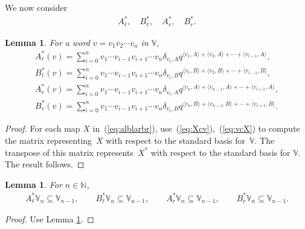 \documentclass[pdftex]{sigma}
\numberwithin{equation}{section}
\newtheorem{Lemma}[Theorem]{Lemma}
\begin{document}
We now consider
\begin{gather}\label{eq:AlBl}
A^*_\ell, \quad B^*_\ell, \quad A^*_r,\quad B^*_r.
\end{gather}

\begin{Lemma}\label{lem:dualaction}For a word $v=v_1v_2\cdots v_n$ in $\mathbb V$,
\begin{gather*}
A^*_\ell(v) = \sum_{i=0}^n
 v_1 \cdots v_{i-1}
	 v_{i+1}\cdots v_n
	 \delta_{v_i,A}
	 q^{\langle v_1,A\rangle+ \langle v_2, A\rangle + \cdots +
	 \langle v_{i-1},A\rangle},
\\
B^*_\ell(v) = \sum_{i=0}^n
 v_1 \cdots v_{i-1}
	 v_{i+1}\cdots v_n
	 \delta_{v_i,B}
	 q^{\langle v_1,B\rangle+ \langle v_2, B\rangle + \cdots +
	 \langle v_{i-1},B\rangle},
\\
A^*_r(v) = \sum_{i=0}^n
 v_1 \cdots v_{i-1}
	 v_{i+1}\cdots v_n
	 \delta_{v_i,A}
	 q^{\langle v_n,A\rangle+ \langle v_{n-1}, A\rangle + \cdots +
	 \langle v_{i+1},A\rangle},
\\
B^*_r(v) = \sum_{i=0}^n
 v_1 \cdots v_{i-1}
	 v_{i+1}\cdots v_n
	 \delta_{v_i,B}
	 q^{\langle v_n,B\rangle+ \langle v_{n-1}, B\rangle + \cdots +
	 \langle v_{i+1},B\rangle}.
\end{gather*}
\end{Lemma}
\begin{proof} For each map $X$ in~(\ref{eq:alblarbr}), use~(\ref{eq:Xcv}),~(\ref{eq:vcX})
to compute the matrix representing~$X$
with respect to the standard basis for~$\mathbb V$.
The transpose of this matrix represents~$X^*$
with respect to the standard basis for $\mathbb V$.
The result follows.
\end{proof}

\begin{Lemma}\label{lem:ABLower2}
For $n \in \mathbb N$,
\begin{gather*}
A^*_{\ell} \mathbb V_n \subseteq \mathbb V_{n-1},
\qquad
B^*_{\ell} \mathbb V_n \subseteq \mathbb V_{n-1},
\qquad
A^*_{r} \mathbb V_n \subseteq \mathbb V_{n-1},
\qquad
B^*_{r} \mathbb V_n \subseteq \mathbb V_{n-1}.
\end{gather*}
\end{Lemma}
\begin{proof}Use
Lemma \ref{lem:dualaction}.
\end{proof}
\end{document}
